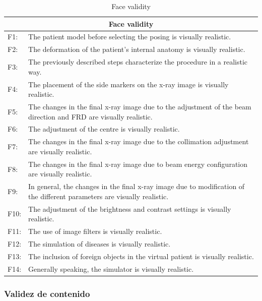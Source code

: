 \begin{table}[hb]
    \centering
    \begin{tabular}{lp{14cm}}
    \hline
    \multicolumn{2}{c}{Face validity }
    \\
    \hline
    F1:     &  The patient model before selecting the posing is visually realistic.  \\
    F2:     & The deformation of the patient’s internal anatomy is visually realistic.  \\
    F3:     & The previously described steps characterize the procedure in a realistic way.  \\
    F4:     & The placement of the side markers on the x-ray image is visually realistic.   \\
    F5:     & The changes in the final x-ray image due to the adjustment of the beam direction and FRD are visually realistic.  \\
    F6:     & The adjustment of the centre is visually realistic. \\
    F7:     & The changes in the final x-ray image due to the collimation adjustment are visually realistic.  \\
    F8:     & The changes in the final x-ray image due to beam energy configuration are visually realistic.  \\
    F9:     & In general, the changes in the final x-ray image due to modification of the different parameters are visually realistic. \\
    F10:     & The adjustment of the brightness and contrast settings is visually realistic.  \\
    F11:     & The use of image filters is visually realistic.  \\
    F12:     & The simulation of diseases is visually realistic.  \\
    F13:     & The inclusion of foreign objects in the virtual patient is visually realistic.  \\
    F14:     & Generally speaking, the simulator is visually realistic.  \\
    
    \hline
    \end{tabular}
    \caption{Face validity}
    \label{tab:facevalidity}
\end{table}
\clearpage
\subsubsection{Validez de contenido}

